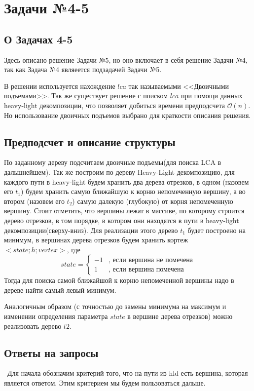 \documentclass{article}
\begin{document}
\section*{Задачи №4-5}
\subsection*{О Задачах 4-5}
Здесь описано решение Задачи №5, но оно включает в себя решение Задачи №4, так как Задача №4 являеется подзадачей Задачи №5.

\qquad
В решении используется нахождение $lca$ так называемыми <<Двоичными подъемами>>. Так же существует решение с поиском $lca$ при помощи данных heavy-light декомпозиции, что позволяет добиться времени предподсчета $\mathcal{O}(n)$. Но использование двоичных подъемов выбрано для краткости описания решения.
\subsection*{Предподсчет и описание структуры}
\qquad
По заданному дереву подсчитаем двоичные подъемы(для поиска LCA в дальшнейшем). Так же построим по дереву Heavy-Light декомпозицию, для каждого пути в heavy-light будем хранить два дерева отрезков, в одном (назовем его $t_1$) будем хранить самую ближайшую к корню непомеченную вершину, а во втором (назовем его $t_2$) самую далекую (глубокую) от корня непомеченную вершину. Стоит отметить, что вершины лежат в массиве, по которому строится дерево отрезков, в том порядке, в котором они находятся в пути в heavy-light декомпозиции(сверху-вниз). Для реализации этого дерево $t_1$ будет построено на минимум, в вершинах дерева отрезков будем хранить кортеж $<state; h; vertex>$, где  
\begin{equation*}
state = 
\begin{cases}
-1 &\text{, если вершина не помечена}\\
1 &\text{, если вершина помечена}
\end{cases}
\end{equation*} 
Тогда для поиска самой ближайшой к корню непомеченной вершины надо в дереве найти самый левый минимум. 

\qquad
Аналогичным образом (с точностью до замены минимума на максимум и изменении определения параметра $state$ в вершине дерева отрезков) можно реализовать дерево $t2$.
\subsection*{Ответы на запросы}
\ Для начала обозначим критерий того, что на пути из hld есть вершина, которая является ответом. Этим критерием мы будем пользоваться дальше. 
\end{document}
